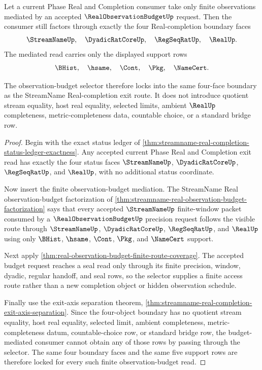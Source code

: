 \begin{theorem}
\label{thm:streamname-real-completion-budget-selector-lock}
Let a current Phase Real and Completion consumer take only finite observations mediated by an accepted $\RealObservationBudgetUp$ request. Then the consumer still factors through exactly the four Real-completion boundary faces
$$
\StreamNameUp,\quad \DyadicRatCoreUp,\quad \RegSeqRatUp,\quad \RealUp.
$$
The mediated read carries only the displayed support rows
$$
\BHist,\quad \hsame,\quad \Cont,\quad \Pkg,\quad \NameCert.
$$

The observation-budget selector therefore locks into the same four-face boundary as the StreamName Real-completion exit route. It does not introduce quotient stream equality, host real equality, selected limits, ambient $\RealUp$ completeness, metric-completeness data, countable choice, or a standard bridge row.
\end{theorem}
\begin{proof}
Begin with the exact status ledger of \autoref{thm:streamname-real-completion-status-ledger-exactness}. Any accepted current Phase Real and Completion exit read has exactly the four status faces $\StreamNameUp$, $\DyadicRatCoreUp$, $\RegSeqRatUp$, and $\RealUp$, with no additional status coordinate.

Now insert the finite observation-budget mediation. The StreamName Real observation-budget factorization of \autoref{thm:streamname-real-observation-budget-factorization} says that every accepted $\StreamNameUp$ finite-window packet consumed by a $\RealObservationBudgetUp$ precision request follows the visible route through $\StreamNameUp$, $\DyadicRatCoreUp$, $\RegSeqRatUp$, and $\RealUp$ using only $\BHist$, $\hsame$, $\Cont$, $\Pkg$, and $\NameCert$ support.

Next apply \autoref{thm:real-observation-budget-finite-route-coverage}. The accepted budget request reaches a seal read only through its finite precision, window, dyadic, regular handoff, and seal rows, so the selector supplies a finite access route rather than a new completion object or hidden observation schedule.

Finally use the exit-axis separation theorem, \autoref{thm:streamname-real-completion-exit-axis-separation}. Since the four-object boundary has no quotient stream equality, host real equality, selected limit, ambient completeness, metric-completeness datum, countable-choice row, or standard bridge row, the budget-mediated consumer cannot obtain any of those rows by passing through the selector. The same four boundary faces and the same five support rows are therefore locked for every such finite observation-budget read.
\end{proof}

